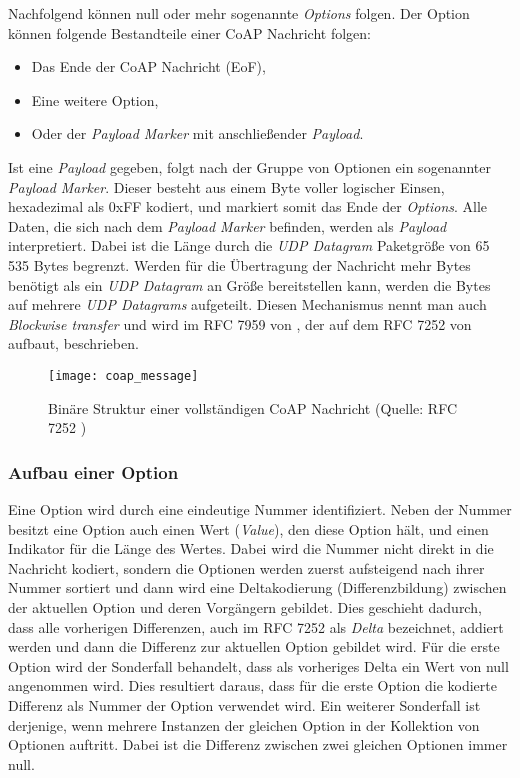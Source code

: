Nachfolgend können null oder mehr sogenannte \textit{Options} folgen. Der Option können folgende Bestandteile einer CoAP Nachricht folgen:
\begin{itemize}
    \item Das Ende der CoAP Nachricht (EoF),
    \item Eine weitere Option,
    \item Oder der \textit{Payload Marker} mit anschließender \textit{Payload}.
\end{itemize}

Ist eine \textit{Payload} gegeben, folgt nach der Gruppe von Optionen ein sogenannter \textit{Payload Marker}. Dieser besteht aus einem Byte voller logischer Einsen, hexadezimal als 0xFF kodiert, und markiert somit das Ende der \textit{Options}. Alle Daten, die sich nach dem \textit{Payload Marker} befinden, werden als \textit{Payload} interpretiert. Dabei ist die Länge durch die \textit{UDP Datagram} Paketgröße von 65 535 Bytes begrenzt. Werden für die Übertragung der Nachricht mehr Bytes benötigt als ein \textit{UDP Datagram} an Größe bereitstellen kann, werden die Bytes auf mehrere \textit{UDP Datagrams} aufgeteilt. Diesen Mechanismus nennt man auch \textit{Blockwise transfer} und wird im RFC 7959 von \citeauthor{RFC7959} \cite{RFC7959}, der auf dem RFC 7252 von \citeauthor{RFC7252} \autocite{RFC7252} aufbaut, beschrieben.

\begin{figure}[h]
    \centering
    \texttt{[image: coap\_message]}
    \caption{Binäre Struktur einer vollständigen CoAP Nachricht (Quelle: RFC 7252 \autocite{RFC7252})}
    \label{fig:binaere-sturktur-einer-vollstaendigen-coap-nachricht}
\end{figure}

\subsubsection{Aufbau einer Option}
\label{subsubsec:aufbau-einer-option}

Eine Option wird durch eine eindeutige Nummer identifiziert. Neben der Nummer besitzt eine Option auch einen Wert (\textit{Value}), den diese Option hält, und einen Indikator für die Länge des Wertes. Dabei wird die Nummer nicht direkt in die Nachricht kodiert, sondern die Optionen werden zuerst aufsteigend nach ihrer Nummer sortiert und dann wird eine Deltakodierung (Differenzbildung) zwischen der aktuellen Option und deren Vorgängern gebildet. Dies geschieht dadurch, dass alle vorherigen Differenzen, auch im RFC 7252 \autocite{RFC7252} als \textit{Delta} bezeichnet, addiert werden und dann die Differenz zur aktuellen Option gebildet wird. Für die erste Option wird der Sonderfall behandelt, dass als vorheriges Delta ein Wert von null angenommen wird. Dies resultiert daraus, dass für die erste Option die kodierte Differenz als Nummer der Option verwendet wird. Ein weiterer Sonderfall ist derjenige, wenn mehrere Instanzen der gleichen Option in der Kollektion von Optionen auftritt. Dabei ist die Differenz zwischen zwei gleichen Optionen immer null.

